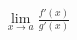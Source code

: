 \documentclass[preview]{standalone}
\begin{document}
\begin{align*}
{\lim_{x \to a} \frac{f'(x)}{g'(x)}}
\end{align*}
\end{document}
